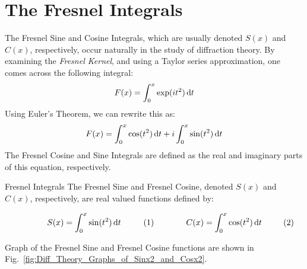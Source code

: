 \section{The Fresnel Integrals}
    The Fresnel Sine and Cosine Integrals, which are
    usually denoted $S(x)$ and $C(x)$, respectively,
    occur naturally in the study of diffraction theory.
    By examining the \textit{Fresnel Kernel},
    and using a Taylor series approximation, one
    comes across the following integral:
    \begin{equation}
        F(x)=\int_{0}^{x}\exp(it^{2})\mathop{}\!\mathrm{d}{t}
    \end{equation}
    Using Euler's Theorem, we can rewrite this as:
    \begin{equation}
        F(x)=\int_{0}^{x}\cos(t^{2})\mathop{}\!\mathrm{d}{t}
            +i\int_{0}^{x}\sin(t^{2})\mathop{}\!\mathrm{d}{t}
    \end{equation}
    The Fresnel Cosine and Sine Integrals are defined
    as the real and
    imaginary parts of this equation, respectively.
    \begin{ldefinition}{Fresnel Integrals}
        The Fresnel Sine and Fresnel Cosine, denoted
        $S(x)$ and $C(x)$, respectively, are real valued
        functions defined by:
        \par\hfill\par
        \vspace{-1ex}
        \begin{subequations}
            \begin{minipage}{0.49\textwidth}
                \begin{equation}
                    S(x)=\int_{0}^{x}
                    \sin(t^{2})\diff{t}
                \end{equation}
            \end{minipage}
            \hfill
            \begin{minipage}{0.49\textwidth}
                \begin{equation}
                    C(x)=\int_{0}^{x}
                    \cos(t^{2})\diff{t}
                \end{equation}
            \end{minipage}
        \end{subequations}
        \par
    \end{ldefinition}
    Graph of the Fresnel Sine and Fresnel Cosine
    functions are shown in
    Fig.~\ref{fig:Diff_Theory_Graphs_of_Sinx2_and_Cosx2}.
